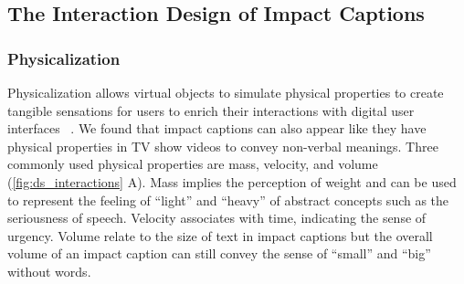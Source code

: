 


\subsection{The Interaction Design of Impact Captions}



\subsubsection{Physicalization}
Physicalization allows virtual objects to simulate physical properties to create tangible sensations for users to enrich their interactions with digital user interfaces ~\cite{sauve2024physicalization, hornecker2006getting}.
We found that impact captions can also appear like they have physical properties in TV show videos to convey non-verbal meanings. Three commonly used physical properties are mass, velocity, and volume (\autoref{fig:ds_interactions} A). 
Mass implies the perception of weight and can be used to represent the feeling of ``light'' and ``heavy'' of abstract concepts such as the seriousness of speech. 
Velocity associates with time, indicating the sense of urgency. 
Volume relate to the size of text in impact captions but the overall volume of an impact caption can still convey the sense of ``small'' and ``big'' without words.


